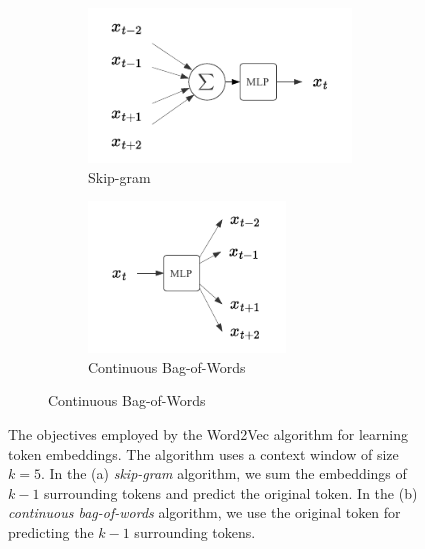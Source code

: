 \begin{figure}[ht]
    \centering

    \begin{subfigure}{\textwidth}
        \centering
        \begin{subfigure}{0.45\textwidth}
            \centering
            \includegraphics[width=\textwidth]{img/skipgram.pdf}
            \caption{Skip-gram}
            \label{fig:skipgram}
        \end{subfigure}
        \hspace{-20px}
        \begin{subfigure}{0.45\textwidth}
            \centering
            \includegraphics[width=0.75\textwidth]{img/cbow.pdf}
            \caption{Continuous Bag-of-Words}
            \label{fig:cbow}
        \end{subfigure}
    \end{subfigure}
    \caption{The objectives employed by the Word2Vec algorithm \cite{mikolov2013distributed} for learning token embeddings. The algorithm uses a context window of size $k=5$. In the (a) \emph{skip-gram} algorithm, we sum the embeddings of $k-1$ surrounding tokens and predict the original token. In the (b) \emph{continuous bag-of-words} algorithm, we use the original token for predicting the $k-1$ surrounding tokens.}
    \label{fig:word2vec}
\end{figure}



